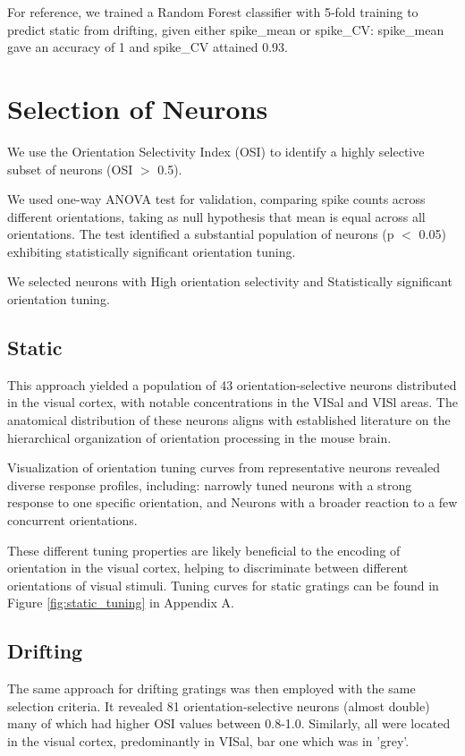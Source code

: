 \documentclass[10pt,twocolumn]{article}
\begin{document}
For reference, we trained a Random Forest classifier with 5-fold training to predict static from drifting, given either spike\_mean or spike\_CV: spike\_mean gave an accuracy of 1 and spike\_CV attained 0.93.

\section{Selection of Neurons}

We use the Orientation Selectivity Index (OSI) to identify a highly selective subset of neurons (OSI $>$ 0.5).

We used one-way ANOVA test for validation, comparing spike counts across different orientations, taking as null hypothesis that mean is equal across all orientations. The test identified a substantial population of neurons (p $<$ 0.05) exhibiting statistically significant orientation tuning.

We selected neurons with High orientation selectivity and Statistically significant orientation tuning.

\subsection{Static}

This approach yielded a population of 43 orientation-selective neurons distributed in the visual cortex, with notable concentrations in the VISal and VISl areas. The anatomical distribution of these neurons aligns with established literature on the hierarchical organization of orientation processing in the mouse brain.

Visualization of orientation tuning curves from representative neurons revealed diverse response profiles, including: narrowly tuned neurons with a strong response to one specific orientation, and Neurons with a broader reaction to a few concurrent orientations.

These different tuning properties are likely beneficial to the encoding of orientation in the visual cortex, helping to discriminate between different orientations of visual stimuli. Tuning curves for static gratings can be found in Figure \ref{fig:static_tuning} in Appendix A.

\subsection{Drifting}

The same approach for drifting gratings was then employed with the same selection criteria. It revealed 81 orientation-selective neurons (almost double) many of which had higher OSI values between 0.8-1.0. Similarly, all were located in the visual cortex, predominantly in VISal, bar one which was in 'grey'.
\end{document}
